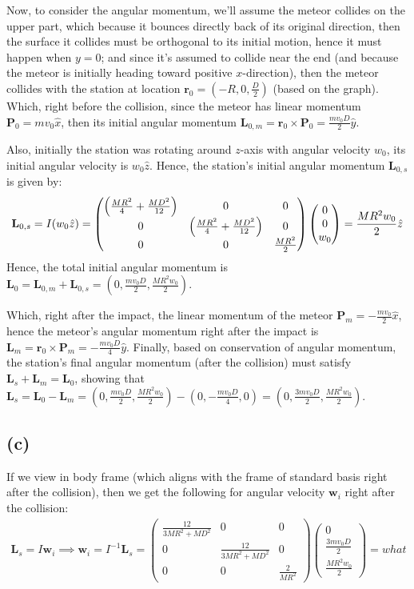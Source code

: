 \documentclass{article}
\DeclarePairedDelimiter{\paran}{(}{)}%
\newcommand{\br}{\textbf{r}} %
\newcommand{\bP}{\textbf{P}} %
\newcommand{\bL}{\textbf{L}} %
\newcommand{\bw}{\textbf{w}} %
\begin{document}
\hfil

Now, to consider the angular momentum, we'll assume the meteor collides on the upper part, which because it bounces directly back of its original direction, then the surface it collides must be orthogonal to its initial motion, hence it must happen when $y=0$; and since it's assumed to collide near the end (and because the meteor is initially heading toward positive $x$-direction), then the meteor collides with the station at location $\br_0=(-R, 0, \frac{D}{2})$ (based on the graph). Which, right before the collision, since the meteor has linear momentum $\bP_0 = mv_0\hat{x}$, then its initial angular momentum $\bL_{0,m} = \br_0\times \bP_0 = \frac{mv_0D}{2}\hat{y}$.

Also, initially the station was rotating around $z$-axis with angular velocity $w_0$, its initial angular velocity is $w_0\hat{z}$. Hence, the station's initial angular momentum $\bL_{0,s}$ is given by:
\begin{align}
    \bL_{0,s}=I(w_0\hat{z}) = \begin{pmatrix}
        \paran*{\frac{MR^2}{4}+\frac{MD^2}{12}}&0&0\\
        0&\paran*{\frac{MR^2}{4}+\frac{MD^2}{12}}&0\\
        0&0& \frac{MR^2}{2}
    \end{pmatrix}\begin{pmatrix}
        0\\0\\w_0
    \end{pmatrix} = \frac{MR^2w_0}{2}\hat{z}
\end{align}
Hence, the total initial angular momentum is $\bL_0 = \bL_{0,m}+\bL_{0,s} = (0,\frac{mv_0D}{2},\frac{MR^2w_0}{2})$.

Which, right after the impact, the linear momentum of the meteor $\bP_m = -\frac{mv_0}{2}\hat{x}$, hence the meteor's angular momentum right after the impact is $\bL_m = \br_0\times \bP_m = -\frac{mv_0D}{4}\hat{y}$. Finally, based on conservation of angular momentum, the station's final angular momentum (after the collision) must satisfy $\bL_s+\bL_m=\bL_0$, showing that $\bL_s = \bL_0-\bL_m = (0,\frac{mv_0D}{2}, \frac{MR^2w_0}{2})-(0,-\frac{mv_0D}{4},0) = (0,\frac{3mv_0D}{2},\frac{MR^2w_0}{2})$.
\subsection*{(c)}
If we view in body frame (which aligns with the frame of standard basis right after the collision), then we get the following for angular velocity $\bw_i$ right after the collision:
\begin{align}
    \bL_s = I\bw_i \implies \bw_i = I^{-1}\bL_s = \begin{pmatrix}
        \frac{12}{3MR^2+MD^2}&0&0\\
        0&\frac{12}{3MR^2+MD^2}&0\\
        0&0&\frac{2}{MR^2}
    \end{pmatrix}\begin{pmatrix}
        0\\\frac{3mv_0D}{2}\\\frac{MR^2w_0}{2}
    \end{pmatrix} = what
\end{align}
\end{document}
